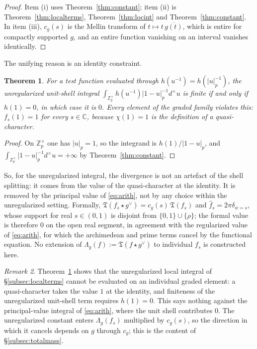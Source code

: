 \documentclass[11pt]{amsart}
\newtheorem{theorem}{Theorem}[section]
\theoremstyle{definition}
\theoremstyle{remark}
\newtheorem{remark}[theorem]{Remark}
\newcommand{\C}{\mathbb C}
\newcommand{\Z}{\mathbb Z}
\begin{document}
\begin{proof}
Item (i) uses Theorem~\ref{thm:constant}; item (ii) is
Theorem~\ref{thm:localterms}, Theorem~\ref{thm:locint} and
Theorem~\ref{thm:constant}.  In item (iii), $c_g(s)$ is the Mellin
transform of $t\mapsto t\,\overline{g(t)}$, which is entire for compactly
supported $g$, and an entire function vanishing on an interval vanishes
identically.
\end{proof}

The unifying reason is an identity constraint.

\begin{theorem}\label{thm:identity}
For a test function evaluated through $h(u^{-1})=h(|u|_p^{-1})$, the
unregularized unit-shell integral $\int_{\Z_p^\times}h(u^{-1})|1-u|_p^{-1}
d^\times u$ is finite if and only if $h(1)=0$, in which case it is $0$.
Every element of the graded family violates this: $f_s(1)=1$ for every
$s\in\C$, because $\chi(1)=1$ is the definition of a quasi-character.
\end{theorem}

\begin{proof}
On $\Z_p^\times$ one has $|u|_p=1$, so the integrand is
$h(1)/|1-u|_p$, and $\int_{\Z_p^\times}|1-u|_p^{-1}d^\times u=+\infty$ by
Theorem~\ref{thm:constant}.
\end{proof}

So, for the unregularized integral, the divergence is not an artefact of
the shell splitting: it comes from the value of the quasi-character at the
identity.  It is removed by the principal value of \eqref{eq:arith}, not by
any choice within the unregularized setting.  Formally,
$\mathfrak T(f_s\star g^\vee)=c_g(s)\,\mathfrak T(f_s)$ and
$\widehat f_s=2\pi\delta_{w=s}$, whose support for real $s\in(0,1)$ is
disjoint from $\{0,1\}\cup\{\rho\}$; the formal value is therefore $0$ on
the open real segment, in agreement with the regularized value of
\eqref{eq:arith}, for which the archimedean and prime terms cancel by the
functional equation.  No extension of $\Lambda_g(f):=\mathfrak T(f\star
g^\vee)$ to individual $f_s$ is constructed here.

\begin{remark}\label{rem:replaces}
Theorem~\ref{thm:identity} shows that the unregularized local integral of
\S\ref{subsec:localterms} cannot be evaluated on an individual graded
element: a quasi-character takes the value $1$ at the identity, and
finiteness of the unregularized unit-shell term requires $h(1)=0$.  This
says nothing against the principal-value integral of \eqref{eq:arith},
where the unit shell contributes $0$.  The unregularized constant enters
$\Lambda_g(f_s)$ multiplied by $c_g(s)$, so the direction in which it
cancels depends on $g$ through $c_g$; this is the content of
\S\ref{subsec:totalmass}.
\end{remark}
\end{document}
